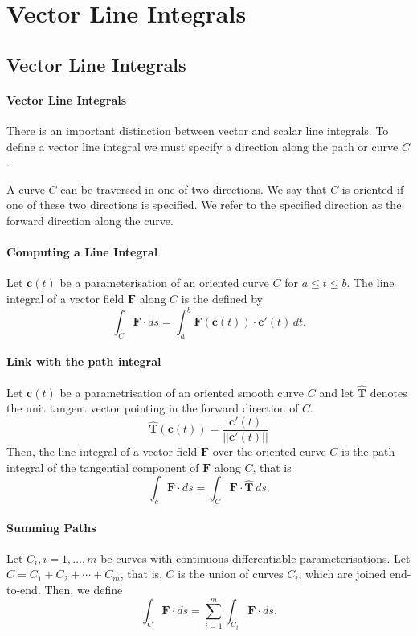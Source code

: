\section{Vector Line Integrals}
\subsection{Vector Line Integrals}
\paragraph{Vector Line Integrals}
There is an important distinction between vector and scalar line integrals. To define a vector line integral we must specify a direction along the path or curve \(C\).

A curve \(C\) can be traversed in one of two directions. We say that \(C\) is oriented if one of these two directions is specified. We refer to the specified direction as the forward direction along the curve.

\paragraph{Computing a Line Integral}
Let \(\textbf{c}(t)\) be a parameterisation of an oriented curve \(C\) for \(a \leq t \leq b\). The line integral of a vector field \(\textbf{F}\) along \(C\) is the defined by 
\[\int_C \textbf{F} \cdot ds = \int_a^b \textbf{F}(\textbf{c}(t)) \cdot \textbf{c}'(t) \, dt.\]

\paragraph{Link with the path integral}
Let \(\textbf{c}(t)\) be a parametrisation of an oriented smooth curve \(C\) and let \(\hat{\textbf{T}}\) denotes the unit tangent vector pointing in the forward direction of \(C\). 
\[\hat{\textbf{T}}(\textbf{c}(t)) = \frac{\textbf{c}'(t)}{||\textbf{c}'(t)||}\]
Then, the line integral of a vector field \(\textbf{F}\) over the oriented curve \(C\) is the path integral of the tangential component of \(\textbf{F}\) along \(C\), that is
\[\int_c \textbf{F} \cdot ds = \int_C \textbf{F} \cdot \hat{\textbf{T}} \, ds.\]

\paragraph{Summing Paths}
Let \(C_i, i = 1,\dots, m\) be curves with continuous differentiable parameterisations. Let \(C = C_1 + C_2 + \cdots + C_m\), that is, \(C\) is the union of curves \(C_i\), which are joined end-to-end. Then, we define
\[\int_C \textbf{F} \cdot ds = \sum_{i=1}^m \int_{C_i} \textbf{F} \cdot ds.\]

